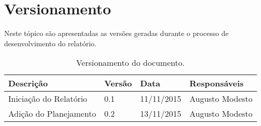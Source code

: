 \chapter[Versionamento]{Versionamento}
\label{chap:versionamento}
	Neste tópico são apresentadas as versões geradas durante o processo de desenvolvimento do relatório.
	
	\label{subsubsec:versionamento_talbe}
		\begin{table}[h]
			\centering
			\begin{tabular}{|p{6cm}|p{1.5cm}|p{2.5cm}|p{4cm}|}
				
				\hline
				
				Descrição & Versão & Data & Responsáveis \\ \hline
				Iniciação do Relatório & 0.1 & 11/11/2015 & Augusto Modesto \\ \hline
				Adição do Planejamento & 0.2 & 13/11/2015 & Augusto Modesto \\ \hline
				




				
			\end{tabular}
			\caption[Versionamento do Documento]{Versionamento do documento.}
			\label{tab:versionamento_tabl}
		\end{table}

